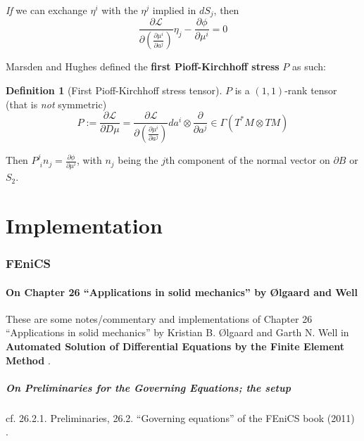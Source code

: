 \documentclass[twoside,landscape,10pt]{amsart}
\theoremstyle{plain}
\theoremstyle{definition}
\newtheorem{definition}{Definition}
\theoremstyle{remark}
\begin{document}
\begin{multicols*}{2}
\emph{If} we can exchange $\eta^i$ with the $\eta^j$ implied in $dS_j$, then 
\begin{equation}
  \boxed{  
    \frac{ \partial \mathcal{L}}{ \partial \left( \frac{ \partial \mu^i}{ \partial a^j} \right) } \eta_j - \frac{ \partial \phi}{ \partial \mu^i} = 0 
}
\end{equation}

Marsden and Hughes \cite{JMarsdenTHughes1994} defined the \textbf{first Pioff-Kirchhoff stress} $P$ as such:
\begin{definition}[First Pioff-Kirchhoff stress tensor]
$P$ is a $(1,1)$-rank tensor (that is \emph{not} symmetric)
\begin{equation}
P := \frac{ \partial \mathcal{L}}{ \partial D\mu } = \frac{ \partial \mathcal{L}}{ \partial \left( \frac{ \partial \mu^i}{ \partial a^j} \right) } da^i \otimes \frac{\partial }{ \partial a^j} \in \Gamma(T^*M\otimes TM)
\end{equation}
\end{definition}

Then $P^j_{\,\,i} n_j = \frac{ \partial \phi}{ \partial \mu^i}$, with $n_j$ being the $j$th component of the normal vector on $\partial B$ or $S_2$.  

\part{Implementation}

\section{FEniCS}

\subsection{On Chapter 26 ``Applications in solid mechanics'' by \O lgaard and Well}

These are some notes/commentary and implementations of Chapter 26 ``Applications in solid mechanics'' by Kristian B. \O lgaard and Garth N. Well in \textbf{Automated Solution of Differential Equations by the Finite Element Method} \cite{FEniCS}.  

\subsubsection{On Preliminaries for the Governing Equations; the setup}

cf. 26.2.1. Preliminaries, 26.2. ``Governing equations'' of the FEniCS book (2011) \cite{FEniCS}.  


\end{multicols*}
\end{document}
